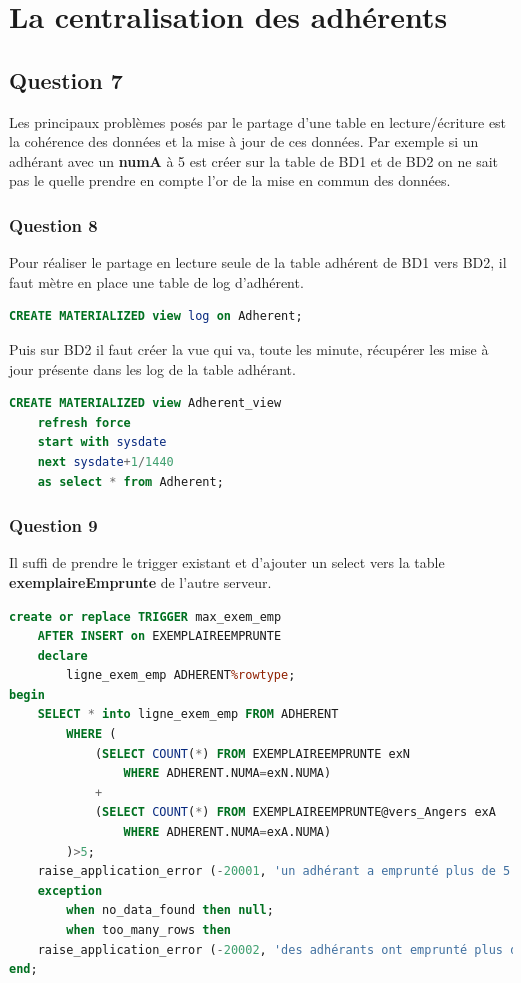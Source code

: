 \documentclass{article}
\begin{document}
\section{La centralisation des adhérents}
\subsection{Question 7}
Les principaux problèmes posés par le partage d'une table en lecture/écriture est la cohérence des données et la mise à jour de ces données. Par exemple si un adhérant avec un \textbf{numA} à 5 est créer sur la table de BD1 et de BD2 on ne sait pas le quelle prendre en compte l'or de la mise en commun des données.

\subsubsection{Question 8}
Pour réaliser le partage en lecture seule de la table adhérent de BD1 vers BD2, il faut mètre en place une table de log d'adhérent.
\begin{lstlisting}[language=SQL, caption= Log d'adhérant sur BD1]
CREATE MATERIALIZED view log on Adherent;
\end{lstlisting}
Puis sur BD2 il faut créer la vue qui va, toute les minute, récupérer les mise à jour présente dans les log de la table adhérant.
\begin{lstlisting}[language=SQL, caption= View d'adhérant sur BD2]
CREATE MATERIALIZED view Adherent_view
    refresh force
    start with sysdate
    next sysdate+1/1440
    as select * from Adherent;
\end{lstlisting}

\subsubsection{Question 9}
Il suffi de prendre le trigger existant et d'ajouter un select vers la table \textbf{exemplaireEmprunte} de l'autre serveur.

\begin{lstlisting}[language=SQL, caption= Trigger max exemplaire emprunter version BD1]
create or replace TRIGGER max_exem_emp
    AFTER INSERT on EXEMPLAIREEMPRUNTE
    declare
        ligne_exem_emp ADHERENT%rowtype;
begin
    SELECT * into ligne_exem_emp FROM ADHERENT 
        WHERE (
            (SELECT COUNT(*) FROM EXEMPLAIREEMPRUNTE exN
                WHERE ADHERENT.NUMA=exN.NUMA)
            +
            (SELECT COUNT(*) FROM EXEMPLAIREEMPRUNTE@vers_Angers exA
                WHERE ADHERENT.NUMA=exA.NUMA)
        )>5;
    raise_application_error (-20001, 'un adhérant a emprunté plus de 5 exemplaires');
    exception
        when no_data_found then null;
        when too_many_rows then
    raise_application_error (-20002, 'des adhérants ont emprunté plus de 5 exemplaires');
end;
\end{lstlisting}
\end{document}
